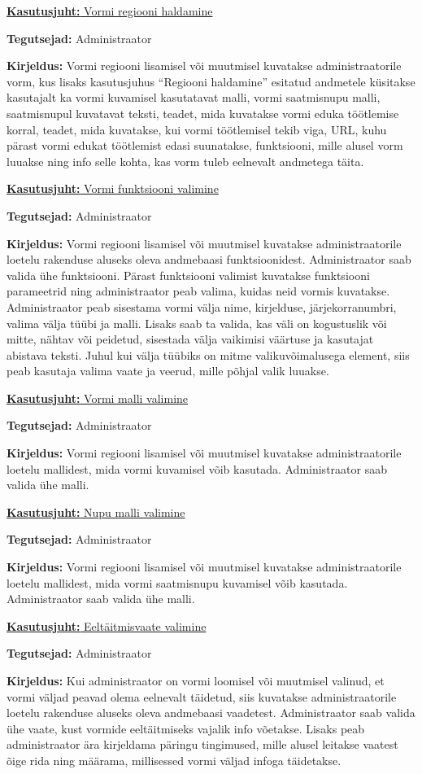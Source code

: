 \documentclass[a4paper,12pt]{article} %
\begin{document}
\underline{\textbf{Kasutusjuht:} Vormi regiooni haldamine}
\par
\textbf{Tegutsejad:} Administraator
\par
\textbf{Kirjeldus:} Vormi regiooni lisamisel või muutmisel kuvatakse administraatorile vorm, kus lisaks kasutusjuhus ``Regiooni haldamine'' esitatud andmetele küsitakse kasutajalt ka vormi kuvamisel kasutatavat malli, vormi saatmisnupu malli, saatmisnupul kuvatavat teksti, teadet, mida kuvatakse vormi eduka töötlemise korral, teadet, mida kuvatakse, kui vormi töötlemisel tekib viga, URL, kuhu pärast vormi edukat töötlemist edasi suunatakse, funktsiooni, mille alusel vorm luuakse ning info selle kohta, kas vorm tuleb eelnevalt andmetega täita.

\underline{\textbf{Kasutusjuht:} Vormi funktsiooni valimine}
\par
\textbf{Tegutsejad:} Administraator
\par
\textbf{Kirjeldus:} Vormi regiooni lisamisel või muutmisel kuvatakse administraatorile loetelu rakenduse aluseks oleva andmebaasi funktsioonidest. Administraator saab valida ühe funktsiooni. Pärast funktsiooni valimist kuvatakse funktsiooni parameetrid ning administraator peab valima, kuidas neid vormis kuvatakse. Administraator peab sisestama vormi välja nime, kirjelduse, järjekorranumbri, valima välja tüübi ja malli. Lisaks saab ta valida, kas väli on kogustuslik või mitte, nähtav või peidetud, sisestada välja vaikimisi väärtuse ja kasutajat abistava teksti. Juhul kui välja tüübiks on mitme valikuvõimalusega element, siis peab kasutaja valima vaate ja veerud, mille põhjal valik luuakse.

\underline{\textbf{Kasutusjuht:} Vormi malli valimine}
\par
\textbf{Tegutsejad:} Administraator
\par
\textbf{Kirjeldus:} Vormi regiooni lisamisel või muutmisel kuvatakse administraatorile loetelu mallidest, mida vormi kuvamisel võib kasutada. Administraator saab valida ühe malli.

\underline{\textbf{Kasutusjuht:} Nupu malli valimine}
\par
\textbf{Tegutsejad:} Administraator
\par
\textbf{Kirjeldus:} Vormi regiooni lisamisel või muutmisel kuvatakse administraatorile loetelu mallidest, mida vormi saatmisnupu kuvamisel võib kasutada. Administraator saab valida ühe malli.

\underline{\textbf{Kasutusjuht:} Eeltäitmisvaate valimine}
\par
\textbf{Tegutsejad:} Administraator
\par
\textbf{Kirjeldus:} Kui administraator on vormi loomisel või muutmisel valinud, et vormi väljad peavad olema eelnevalt täidetud, siis kuvatakse administraatorile loetelu rakenduse aluseks oleva andmebaasi vaadetest. Administraator saab valida ühe vaate, kust vormide eeltäitmiseks vajalik info võetakse. Lisaks peab administraator ära kirjeldama päringu tingimused, mille alusel leitakse vaatest õige rida ning määrama, millisessed vormi väljad infoga täidetakse.
\end{document}
